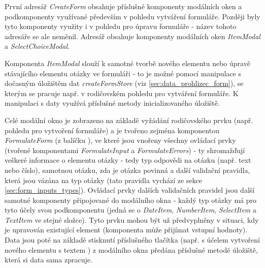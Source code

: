 			První adresář \textit{CreateForm} obsahuje příslušné komponenty modálních oken a podkomponenty využívané především v pohledu vytváření formuláře. Později byly tyto komponenty využity i v pohledu pro úpravu formuláře - název tohoto adresáře se ale neměnil. Adresář obsahuje komponenty modálních oken \textit{ItemModal} a \textit{SelectChoiceModal}.
			
			Komponenta \textit{ItemModal} slouží k samotné tvorbě nového elementu nebo úpravě stávajícího elementu otázky ve formuláři - to je možné pomocí manipulace s dočasným úložištěm dat \textit{createFormStore} (viz \ref{sec:data_prohlizec_form}), se kterým se pracuje např. v rodičovském pohledu pro vytváření formuláře. K manipulaci s daty využívá příslušné metody inicializovaného úložiště.
			
			Celé modální okno je zobrazeno na základě vyžádání rodičovského prvku (např. pohledu pro vytvoření formuláře) a je tvořeno zejména komponentou \textit{FormulateForm} (z balíčku ), ve které jsou vnořeny všechny ovládací prvky (tvořené komponentami \textit{FormulateInput} a \textit{FormulateErrors}) - ty shromažďují veškeré informace o elementu otázky - tedy typ odpovědi na otázku (např. text nebo číslo), samotnou otázku, zda je otázka povinná a další validační pravidla, která jsou vázána na typ otázky (tato pravidla vychází ze sekce \ref{sec:form_inputs_types}). Ovládací prvky dalších validačních pravidel jsou další samotné komponenty připojované do modálního okna - každý typ otázky má pro tyto účely svou podkomponentu (jedná se o \textit{DateItem}, \textit{NumberItem}, \textit{SelectItem} a \textit{TextItem} ve stejné složce). Tyto prvku mohou být už předvyplněny v situaci, kdy je upravován existující element (komponenta může přijímat vstupní hodnoty). Data jsou poté na základě stisknutí příslušného tlačítka (např. s účelem vytvoření nového elementu s textem ) z modálního okna předána příslušné metodě úložiště, která si data sama zpracuje.
			
